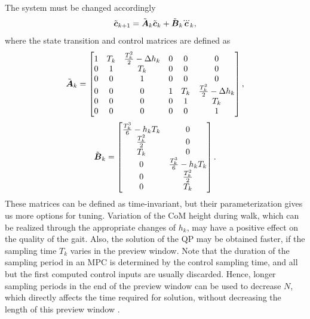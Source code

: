 The system must be changed accordingly
\begin{equation}\label{eq.system_sub1}
\tilde{\mbm{c}}_{k+1} = \tilde{\mbm{A}}_k\tilde{\mbm{c}}_{k} + \tilde{\mbm{B}}_k\dddot{\mbm{c}}_{k},
\end{equation}
where the state transition and control matrices are defined as 
$$
\tilde{\mbox{\boldmath $A$}}_k =
\begin{bmatrix}
    1 & T_k & \frac{T_k^{2}}{2}-\Delta h_k & 0 & 0 & 0\\ 
    0 & 1 & T_k & 0 & 0 & 0\\ 
    0 & 0 & 1 & 0 & 0 & 0\\
    0 & 0 & 0 & 1 & T_k & \frac{T_k^{2}}{2}-\Delta h_k\\
    0 & 0 & 0 & 0 & 1 & T_k\\
    0 & 0 & 0 & 0 & 0 & 1
\end{bmatrix},
$$
$$
\tilde{\mbox{\boldmath $B$}}_k = 
\begin{bmatrix}
    \frac{T_k^{3}}{6} - h_k T_k     & 0\\ 
    \frac{T_k^{2}}{2}               & 0\\ 
    T_k                             & 0\\
    0                               & \frac{T_k^{3}}{6} - h_k T_k\\
    0                               & \frac{T_k^{2}}{2}\\
    0                               & T_k
\end{bmatrix}.
$$
These matrices can be defined as time-invariant, but their parameterization gives us more options 
for tuning. Variation of the \ac{CoM} height during walk, which can be realized through the
appropriate changes of $h_k$, may have a positive effect on the quality of the gait. Also,
the solution of the \ac{QP} may be obtained faster, if the sampling time $T_k$ varies in 
the preview window. Note that the duration of the sampling period in an \ac{MPC} is determined 
by the control sampling time, and all but the first computed control inputs are usually 
discarded. Hence, longer sampling periods in the end of the preview window can be used to 
decrease $N$, which directly affects the time required for solution, without decreasing the 
length of this preview window \cite{dimitrov2008implementation}.

